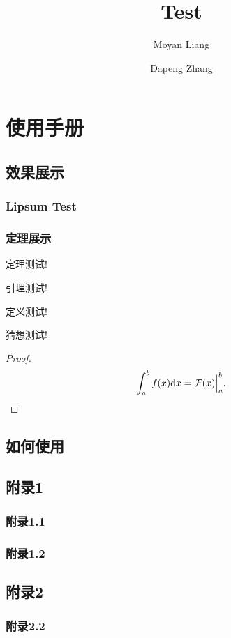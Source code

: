 \documentclass{inkbook}
\title{Test}
\author{Moyan Liang \and Dapeng Zhang}
\begin{document}
    \maketitle
    \tableofcontents
    \part{使用手册}
    \chapter{效果展示}
    \section{Lipsum Test}
    \lipsum[1-20]
    \section{定理展示}
    \begin{theorem}
        定理测试!
    \end{theorem}
    \begin{lemma}
        引理测试!
    \end{lemma}
    \begin{definition}
        定义测试!
    \end{definition}
    \begin{conjecture}
        猜想测试!
    \end{conjecture}
    \begin{proof}
        \begin{equation}
        \int_a^b f(x)\mathrm{d} x =\mathcal{F}(x)\Big|_a^b. 
    \end{equation}
    \end{proof}
    \chapter{如何使用}

    \appendix

    \chapter{附录1}

    \section{附录1.1}

    \lipsum[1-5]

    \section{附录1.2}

    \lipsum[1-5]

    \chapter{附录2}

    \section{附录2.2}

    \lipsum[2]
    
\end{document}
